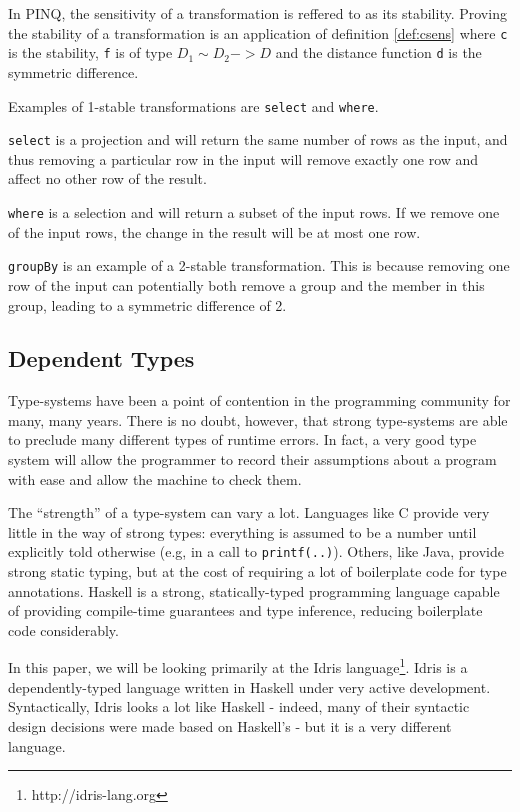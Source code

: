 \documentclass[12pt]{article}
\begin{document}
In PINQ, the sensitivity of a transformation is reffered to as its stability. Proving the stability of a transformation is an application of definition \ref{def:csens} where \texttt{c} is the stability, \texttt{f} is of type  $D_1 \sim D_2 -> D$ and the distance function \texttt{d} is the symmetric difference.

Examples of 1-stable transformations are \texttt{select} and \texttt{where}. 

\texttt{select} is a projection and will return the same number of rows as the input, and thus removing a particular row in the input will remove exactly one row and affect no other row of the result.

\texttt{where} is a selection and will return a subset of the input rows. If we remove one of the input rows, the change in the result will be at most one row.

\texttt{groupBy} is an example of a 2-stable transformation. This is because removing one row of the input can potentially both remove a group and the member in this group, leading to a symmetric difference of 2.


\subsection{Dependent Types}

Type-systems have been a point of contention in the programming community for many, many years.
There is no doubt, however, that strong type-systems are able to preclude many different types of runtime errors.
In fact, a very good type system will allow the programmer to record their assumptions about a program with ease and allow the machine to check them.

The ``strength'' of a type-system can vary a lot.
Languages like C provide very little in the way of strong types: everything is assumed to be a number until explicitly told otherwise (e.g, in a call to \texttt{printf(..)}).
Others, like Java, provide strong static typing, but at the cost of requiring a lot of boilerplate code for type annotations.
Haskell is a strong, statically-typed programming language capable of providing compile-time guarantees and type inference, reducing boilerplate code considerably.

In this paper, we will be looking primarily at the Idris language\footnote{http://idris-lang.org}.
Idris is a dependently-typed language written in Haskell under very active development.
Syntactically, Idris looks a lot like Haskell - indeed, many of their syntactic design decisions were made based on Haskell's - but it is a very different language.
\end{document}
